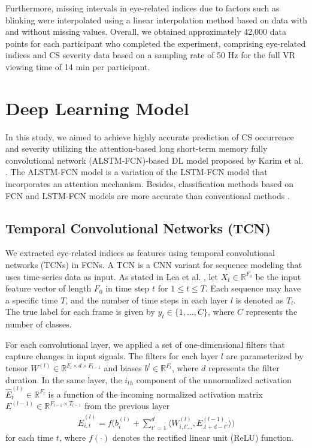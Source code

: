 \documentclass{ieeeaccess}
\begin{document}
Furthermore, missing intervals in eye-related indices due to factors such as blinking were interpolated using a linear interpolation method based on data with and without missing values. Overall, we obtained approximately 42,000 data points for each participant who completed the experiment, comprising eye-related indices and CS severity data based on a sampling rate of 50 Hz for the full VR viewing time of 14 min per participant.


\section{Deep Learning Model}%
In this study, we aimed to achieve highly accurate prediction of CS occurrence and severity utilizing the attention-based long short-term memory fully convolutional network (ALSTM-FCN)-based DL model proposed by Karim et al. \cite{Karim_2017}. The ALSTM-FCN model is a variation of the LSTM-FCN model that incorporates an attention mechanism. Besides, classification methods based on FCN and LSTM-FCN models are more accurate than conventional methods \cite{Wang_DL_2016, Karim_2017}.


\subsection{Temporal Convolutional Networks (TCN)}
We extracted eye-related indices as features using temporal convolutional networks (TCNs) in FCNs. A TCN is a CNN variant for sequence modeling that uses time-series data as input. As stated in Lea et al. \cite{Lea_2016}, let $X_t \in \mathbb{R}^{F_0}$ be the input feature vector of length $F_0$ in time step $t$ for $1  \leq t \leq T$. Each sequence may have a specific time $T$, and the number of time steps in each layer $l$ is denoted as $T_l$. The true label for each frame is given by $y_t \in \{1, . . . , C\}$, where $C$ represents the number of classes. 

For each convolutional layer, we applied a set of one-dimensional filters that capture changes in input signals. The filters for each layer $l$ are parameterized by tensor $W^{(l)} \in \mathbb{R}^{F_l \times d \times F_{l-1}}$ and biases $b^{l} \in \mathbb{R}^{F_l}$, where $d$ represents the filter duration. In the same layer, the $i_{th}$ component of the unnormalized activation $\widehat{E}_t^{(l)} \in \mathbb{R}^{F_l}$ is a function of the incoming normalized activation matrix $E^{(l-1)} \in \mathbb{R}^{F_{l-1} \times T_{l-1}}$ from the previous layer \cite{Lea_2016}
\begin{align}
    \widehat{E}_{i,t}^{(l)} = f \Biggl(b_i^{(l)} + \sum_{t'=1}^d \Bigr \langle W_{i,t',.}^{(l)}, E_{.t+d-t'}^{(l-1)} \Bigr \rangle \Biggl)
\end{align}
for each time $t$, where $f(\cdot)$ denotes the rectified linear unit (ReLU) function.
\end{document}
